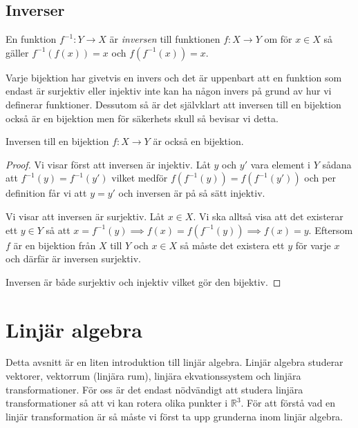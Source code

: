 \documentclass{article}
\theoremstyle{definition}
\begin{document}
\subsection{Inverser}
\begin{mydef}{}{}
  En funktion $f^{-1}: Y \rightarrow X$ är \textit{inversen} till funktionen 
  $f: X \rightarrow Y$ om för $x \in X$ så gäller $f^{-1}(f(x)) = x$ och $f(f^{-1}(x)) = x.$ 
\end{mydef}
Varje bijektion har givetvis en invers och det är uppenbart att en funktion som endast 
är surjektiv eller injektiv inte kan ha någon invers på grund av hur vi definerar funktioner. Dessutom så är det självklart att inversen 
till en bijektion också är en bijektion men för säkerhets skull så bevisar vi detta. 
\hypertarget{invbij}{}
\begin{mytheo}{}{}
  Inversen till en bijektion $f: X \rightarrow Y$ är också en bijektion.
\end{mytheo}
\begin{proof}
  Vi visar först att inversen är injektiv. Låt $y$ och $y'$ vara element i $Y$ sådana att 
  $f^{-1}(y) = f^{-1}(y')$ vilket medför $f(f^{-1}(y)) = f(f^{-1}(y'))$ och per definition 
  får vi att $y = y'$ och inversen är på så sätt injektiv.

  Vi visar att inversen är surjektiv.
  Låt $x \in X$. Vi ska alltså visa att det existerar ett $y \in Y$ så att 
  $x = f^{-1}(y) \implies f(x) = f(f^{-1}(y)) \implies f(x) = y.$ Eftersom 
  $f$ är en bijektion från $X$ till $Y$ och $x \in X$ så måste det existera ett $y$ för 
  varje $x$ och därfär är inversen surjektiv. 
  
  Inversen är både surjektiv och injektiv vilket gör den bijektiv.
\end{proof}

\section{Linjär algebra}
Detta avsnitt är en liten introduktion till linjär algebra. Linjär algebra studerar vektorer, vektorrum 
(linjära rum), linjära ekvationssystem och linjära transformationer. För oss är det endast nödvändigt 
att studera linjära transformationer så att vi kan rotera olika punkter i $\mathbb{R}^3$. För att förstå 
vad en linjär transformation är så måste vi först ta upp grunderna inom linjär algebra. 

\end{document}
